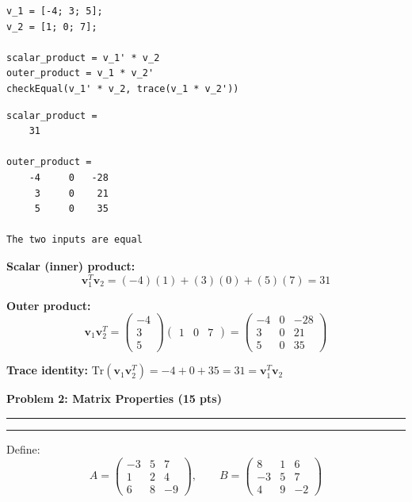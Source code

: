 \documentclass[12pt]{article}
\newcommand{\question}[1]{%
  \clearpage
  \vspace{0.5cm}
  {\noindent\normalsize \textbf{#1}}
  \vspace{0.2cm}
  \hrule
  \vspace{0.1cm}
  \hrule
  \vspace{0.3cm}
}
\begin{document}
\begin{codebox}
\begin{lstlisting}
v_1 = [-4; 3; 5];
v_2 = [1; 0; 7];

scalar_product = v_1' * v_2
outer_product = v_1 * v_2'
checkEqual(v_1' * v_2, trace(v_1 * v_2'))
\end{lstlisting}
\end{codebox}

\begin{outputbox}
\begin{lstlisting}[style=output]
scalar_product =
    31

outer_product =
    -4     0   -28
     3     0    21
     5     0    35

The two inputs are equal
\end{lstlisting}
\end{outputbox}

\begin{resultsbox}
\textbf{Scalar (inner) product:}
\[
\mathbf{v}_1^T \mathbf{v}_2 = (-4)(1) + (3)(0) + (5)(7) = 31
\]

\textbf{Outer product:}
\[
\mathbf{v}_1 \mathbf{v}_2^T = \begin{pmatrix} -4 \\ 3 \\ 5 \end{pmatrix} \begin{pmatrix} 1 & 0 & 7 \end{pmatrix} = \begin{pmatrix} -4 & 0 & -28 \\ 3 & 0 & 21 \\ 5 & 0 & 35 \end{pmatrix}
\]

\textbf{Trace identity:}
$\mathrm{Tr}(\mathbf{v}_1 \mathbf{v}_2^T) = -4 + 0 + 35 = 31 = \mathbf{v}_1^T \mathbf{v}_2$ \quad \checkmark
\end{resultsbox}


\question{Problem 2: Matrix Properties (15 pts)}\label{prob:2}

Define:
\[
A = \begin{pmatrix} -3 & 5 & 7 \\ 1 & 2 & 4 \\ 6 & 8 & -9 \end{pmatrix}, \qquad
B = \begin{pmatrix} 8 & 1 & 6 \\ -3 & 5 & 7 \\ 4 & 9 & -2 \end{pmatrix}
\]
\end{document}
